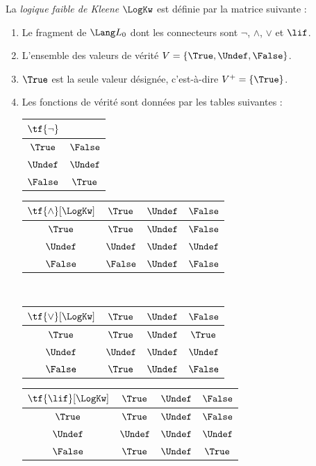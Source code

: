\documentclass[../../../include/open-logic-section]{subfiles}
\begin{document}
\begin{defn}
La \emph{logique faible de Kleene}
$\LogKw$ est définie par la matrice
suivante :
\begin{enumerate}
  \item Le fragment de $\Lang L_0$ dont les connecteurs sont $\lnot$,
  $\land$, $\lor$ et $\lif$.
  \item L'ensemble des valeurs de vérité
  $V=\{\True,\Undef,\False\}$.
  \item $\True$ est la seule valeur
  désignée, c'est-à-dire
  $V^+=\{\True\}$.
  \item Les fonctions de vérité sont
  données par les tables suivantes :
  \begin{center}
    \begin{tabular}{c|c}
      $\tf{\lnot}$ & \\
      \hline
      $\True$ & $\False$ \\
      $\Undef$ & $\Undef$ \\
      $\False$ & $\True$
    \end{tabular}
    \quad
    \begin{tabular}{c|ccc}
      $\tf{\land}[\LogKw]$ & $\True$ & $\Undef$ & $\False$ \\
      \hline
      $\True$ & $\True$ & $\Undef$ & $\False$ \\
      $\Undef$ & $\Undef$ & $\Undef$ & $\Undef$ \\
      $\False$ & $\False$ & $\Undef$ & $\False$
    \end{tabular}
    \\[2ex]
    \begin{tabular}{c|ccc}
      $\tf{\lor}[\LogKw]$ & $\True$ & $\Undef$ & $\False$ \\
      \hline
      $\True$ & $\True$ & $\Undef$ & $\True$ \\
      $\Undef$ & $\Undef$ & $\Undef$ & $\Undef$ \\
      $\False$ & $\True$ & $\Undef$ & $\False$
    \end{tabular}
    \quad
    \begin{tabular}{c|ccc}
      $\tf{\lif}[\LogKw]$ & $\True$ & $\Undef$ & $\False$ \\
      \hline
      $\True$ & $\True$ & $\Undef$ & $\False$ \\
      $\Undef$ & $\Undef$ & $\Undef$ & $\Undef$ \\
      $\False$ & $\True$ & $\Undef$ & $\True$
    \end{tabular}
  \end{center}
\end{enumerate}
\end{defn}
\end{document}
